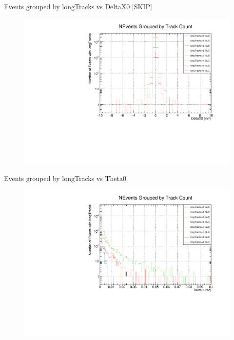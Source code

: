 \begin{frame}{Events grouped by longTracks vs DeltaX0 [SKIP]}
    \begin{figure}
        \includegraphics[width=\linewidth]{./output/DeltaX0_all.pdf}
    \end{figure}
\end{frame}

\begin{frame}{Events grouped by longTracks vs Theta0 }
    \begin{figure}
        \includegraphics[width=\linewidth]{./output/Theta0_all.pdf}
    \end{figure}
\end{frame}


